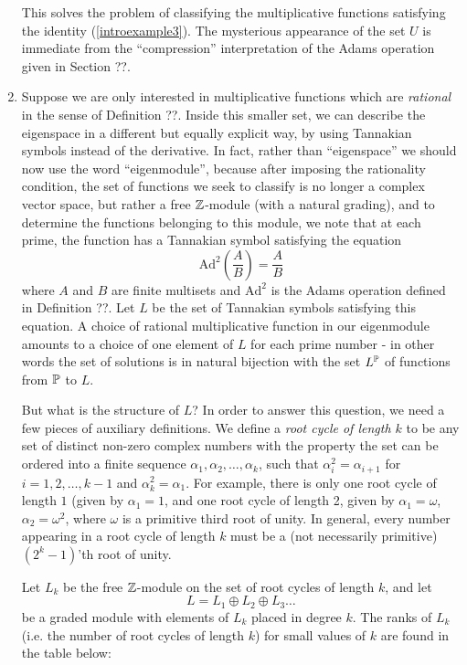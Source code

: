 \begin{example}
\begin{enumerate}
This solves the problem of classifying the multiplicative functions satisfying the identity (\ref{introexample3}). The mysterious appearance of the set $U$ is immediate from the ``compression'' interpretation of the Adams operation given in Section ??.


\item Suppose we are only interested in multiplicative functions which are \emph{rational} in the sense of Definition ??. Inside this smaller set, we can describe the eigenspace in a different but equally explicit way, by using Tannakian symbols instead of the derivative. In fact, rather than ``eigenspace'' we should now use the word ``eigenmodule'', because after imposing the rationality condition, the set of functions we seek to classify is no longer a complex vector space, but rather a free $\mathbb{Z}$-module (with a natural grading), and to determine the functions belonging to this module, we note that at each prime, the function has a Tannakian symbol satisfying the equation 
$$   \text{Ad}^2(\frac{A}{B}) = \frac{A}{B}   $$
where $A$ and $B$ are finite multisets and $\text{Ad}^2$ is the Adams operation defined in Definition ??. Let $L$ be the set of Tannakian symbols satisfying this equation. A choice of rational multiplicative function in our eigenmodule amounts to a choice of one element of $L$ for each prime number - in other words the set of solutions is in natural bijection with the set $L^{\mathbb{P}}$ of functions from $\mathbb{P}$ to $L$. 

But what is the structure of $L$? In order to answer this question, we need a few pieces of auxiliary definitions. We define a \emph{root cycle of length $k$} to be any set of distinct non-zero complex numbers with the property the set can be ordered into a finite sequence $\alpha_1, \alpha_2, \ldots, \alpha_k$, such that $\alpha_i^2 = \alpha_{i+1}$ for $i = 1, 2, \ldots, k-1$ and $\alpha_k^2 = \alpha_1$. For example, there is only one root cycle of length $1$ (given by $\alpha_1 = 1$, and one root cycle of length 2, given by $\alpha_1 = \omega$, $\alpha_2 = \omega^2$, where $\omega$ is a primitive third root of unity. In general, every number appearing in a root cycle of length $k$ must be a (not necessarily primitive) $(2^k-1)$'th root of unity.

 Let $L_k$ be the free $\mathbb{Z}$-module on the set of root cycles of length $k$, and let 
$$  L = L_1 \oplus L_2 \oplus L_3 \ldots   $$
be a graded module with elements of $L_k$ placed in degree $k$. The ranks of $L_k$ (i.e. the number of root cycles of length $k$) for small values of $k$ are found in the table below:


\end{enumerate}
\end{example}
